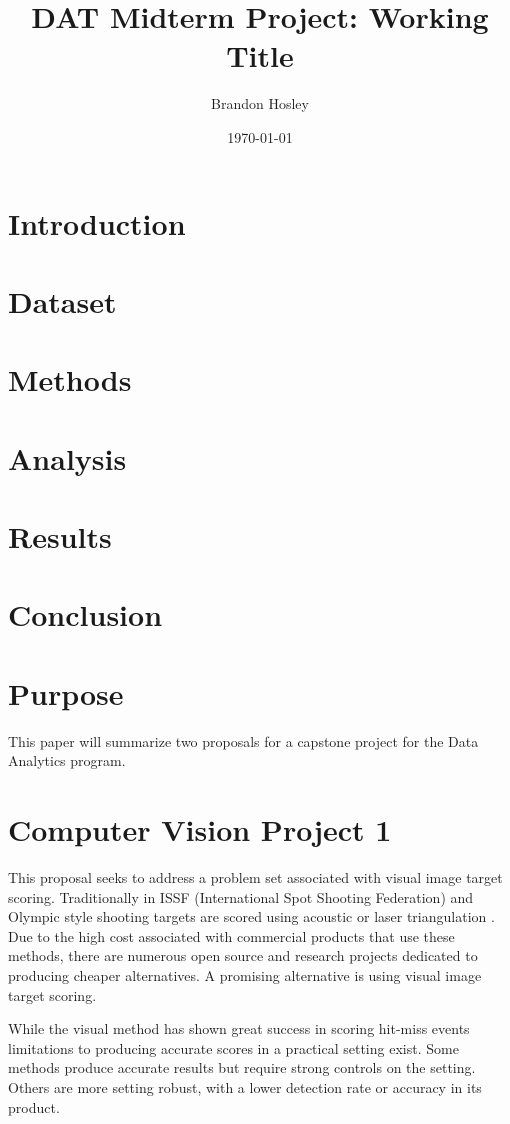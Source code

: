 \documentclass[conference]{IEEEtran}
\title{DAT Midterm Project: Working Title}
\author{Brandon Hosley}
\date{\today}
\begin{document}
	\maketitle
	
\section{Introduction}
\section{Dataset}
\section{Methods}
\section{Analysis}
\section{Results}
\section{Conclusion}

	
\section{Purpose} 

This paper will summarize two proposals for a capstone project for the Data Analytics program.

\section{Computer Vision Project 1}

This proposal seeks to address a problem set associated with visual image target scoring. Traditionally in ISSF (International Spot Shooting Federation) and Olympic style shooting
targets are scored using acoustic or laser triangulation 
\cite{Anderson2018} \cite{SUIS}.
Due to the high cost associated with commercial products that use these methods, 
there are numerous open source \cite{etarg} \cite{freetarget}
and research projects \cite{Rudzinski2012} \cite{Stenhager2021}
dedicated to producing cheaper alternatives.
A promising alternative is using visual image target scoring.

While the visual method has shown great success in scoring hit-miss events \cite{Ye2011}
limitations to producing accurate scores in a practical setting exist.
Some methods \cite{Rudzinski2012} produce accurate results 
but require strong controls on the setting.
Others \cite{Stenhager2021} are more setting robust, 
with a lower detection rate or accuracy in its product.
\end{document}
